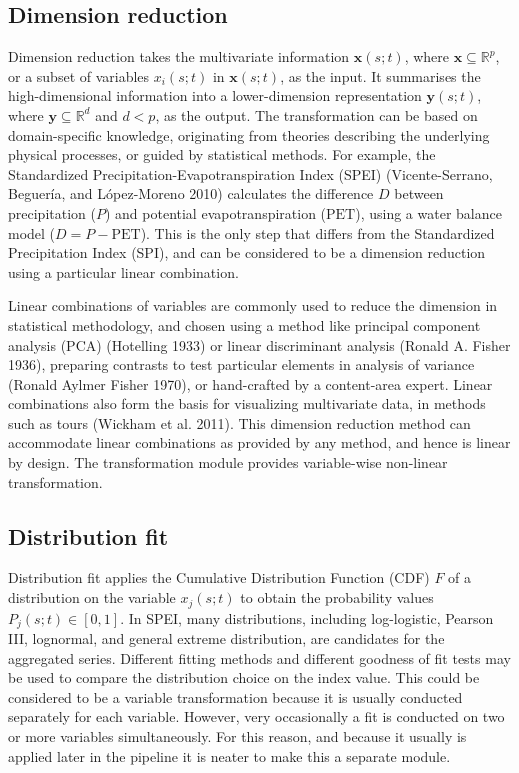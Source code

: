 \documentclass[
]{interact}
\begin{document}
\subsection{Dimension reduction}\label{dimension-reduction}

Dimension reduction takes the multivariate information
\(\mathbf{x}(s;t)\), where \(\mathbf{x} \subseteq \mathbb{R}^p\), or a
subset of variables \(x_i(s;t)\) in \(\mathbf{x}(s;t)\), as the input.
It summarises the high-dimensional information into a lower-dimension
representation \(\mathbf{y}(s;t)\), where
\(\mathbf{y} \subseteq \mathbb{R}^d\) and \(d < p\), as the output. The
transformation can be based on domain-specific knowledge, originating
from theories describing the underlying physical processes, or guided by
statistical methods. For example, the Standardized
Precipitation-Evapotranspiration Index (SPEI) (Vicente-Serrano,
Beguería, and López-Moreno 2010) calculates the difference \(D\) between
precipitation (\(P\)) and potential evapotranspiration (\(\text{PET}\)),
using a water balance model (\(D = P - \text{PET}\)). This is the only
step that differs from the Standardized Precipitation Index (SPI), and
can be considered to be a dimension reduction using a particular linear
combination.

Linear combinations of variables are commonly used to reduce the
dimension in statistical methodology, and chosen using a method like
principal component analysis (PCA) (Hotelling 1933) or linear
discriminant analysis (Ronald A. Fisher 1936), preparing contrasts to
test particular elements in analysis of variance (Ronald Aylmer Fisher
1970), or hand-crafted by a content-area expert. Linear combinations
also form the basis for visualizing multivariate data, in methods such
as tours (Wickham et al. 2011). This dimension reduction method can
accommodate linear combinations as provided by any method, and hence is
linear by design. The transformation module provides variable-wise
non-linear transformation.

\subsection{Distribution fit}\label{distribution-fit}

Distribution fit applies the Cumulative Distribution Function (CDF)
\(F\) of a distribution on the variable \(x_j(s; t)\) to obtain the
probability values \(P_j(s;t) \in [0, 1]\). In SPEI, many distributions,
including log-logistic, Pearson III, lognormal, and general extreme
distribution, are candidates for the aggregated series. Different
fitting methods and different goodness of fit tests may be used to
compare the distribution choice on the index value. This could be
considered to be a variable transformation because it is usually
conducted separately for each variable. However, very occasionally a fit
is conducted on two or more variables simultaneously. For this reason,
and because it usually is applied later in the pipeline it is neater to
make this a separate module.
\end{document}
